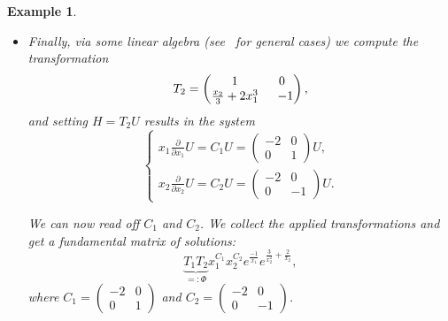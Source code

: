 \documentclass[final,1p,times,number,amsthm]{elsart}
\newtheorem{example}[lemma]{Example}
\newcommand{\pder}[2]{\frac{\partial}{\partial #2}#1}
\begin{document}
\begin{example}
\begin{itemize}
    \[
    T_1=\left(\begin{matrix}
        x_2 x_1^3 & -x_2 \\
        0 & 1
      \end{matrix}\right),
    \]
    we get:
    \begin{equation*}
      \begin{cases}
        x_1 \pder{H}{x_1} = \left(\begin{matrix}
            -2 & 0 \\
            -x_2 & 1
          \end{matrix}\right) H,  \\
        x_2 \pder{H}{x_2} = \left(\begin{matrix}
            -2 & 0\\
            -2 x_1^3 & -1
          \end{matrix}\right) H.
      \end{cases}
    \end{equation*}
  \item Finally, via some linear algebra (see~\cite[Chapter 3]{key73} for
    general cases) we compute the transformation
    \[
    T_2=\left(\begin{matrix}
        1 & 0 \\
        \frac{x_2}{3} + 2 x_1^3 &\hspace{0.2cm}-1
      \end{matrix}\right),
    \]
    and setting $H=T_2 U$ results in the system
\[
\begin{cases}
  x_1 \pder{U}{x_1} = C_1 U = \left(\begin{matrix} -2 & 0 \\ 0 &
      1 \end{matrix}\right) U ,\\
  x_2 \pder{U}{x_2} = C_2 U = \left(\begin{matrix} -2 & 0 \\ 0 &
      -1 \end{matrix}\right)U.
\end{cases}
\]

We can now read off $C_1$ and $C_2$. We collect the applied
transformations and get a fundamental matrix of solutions:
    \[
      \underbrace{T_1 T_2}_{=:\Phi} x_1^{C_1} x_2^{C_2}e^{\frac{-1}{x_1}}
      e^{\frac{3}{x_2^2} + \frac{2}{x_2}},
    \]
    where $C_1=\left(\begin{matrix} -2 & 0 \\ 0 & 1 \end{matrix}\right)$ and
    $C_2=\left(\begin{matrix} -2 & 0 \\ 0 & -1 \end{matrix}\right)$.
  \end{itemize}
\end{example}
\end{document}
